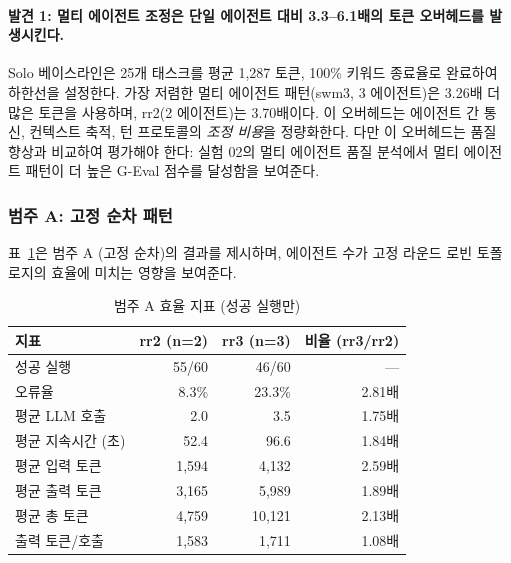 \paragraph{발견 1: 멀티 에이전트 조정은 단일 에이전트 대비 3.3--6.1배의 토큰 오버헤드를 발생시킨다.}
Solo 베이스라인은 25개 태스크를 평균 1,287 토큰, 100\% 키워드 종료율로 완료하여 하한선을 설정한다. 가장 저렴한 멀티 에이전트 패턴(swm3, 3 에이전트)은 3.26배 더 많은 토큰을 사용하며, rr2(2 에이전트)는 3.70배이다. 이 오버헤드는 에이전트 간 통신, 컨텍스트 축적, 턴 프로토콜의 \emph{조정 비용}을 정량화한다. 다만 이 오버헤드는 품질 향상과 비교하여 평가해야 한다: 실험 02의 멀티 에이전트 품질 분석에서 멀티 에이전트 패턴이 더 높은 G-Eval 점수를 달성함을 보여준다.

\subsubsection{범주 A: 고정 순차 패턴}

표~\ref{tab:cat-a-efficiency}은 범주 A (고정 순차)의 결과를 제시하며, 에이전트 수가 고정 라운드 로빈 토폴로지의 효율에 미치는 영향을 보여준다.

\begin{table}[H]
\centering
\caption{범주 A 효율 지표 (성공 실행만)}
\label{tab:cat-a-efficiency}
{\small
\begin{tabular}{lrrr}
\toprule
지표 & rr2 (n=2) & rr3 (n=3) & 비율 (rr3/rr2) \\
\midrule
성공 실행      & 55/60 & 46/60 & --- \\
오류율          & 8.3\% & 23.3\% & 2.81배 \\
평균 LLM 호출  & 2.0 & 3.5 & 1.75배 \\
평균 지속시간 (초) & 52.4 & 96.6 & 1.84배 \\
평균 입력 토큰  & 1,594 & 4,132 & 2.59배 \\
평균 출력 토큰  & 3,165 & 5,989 & 1.89배 \\
평균 총 토큰    & 4,759 & 10,121 & 2.13배 \\
출력 토큰/호출  & 1,583 & 1,711 & 1.08배 \\
\bottomrule
\end{tabular}
}
\end{table}

